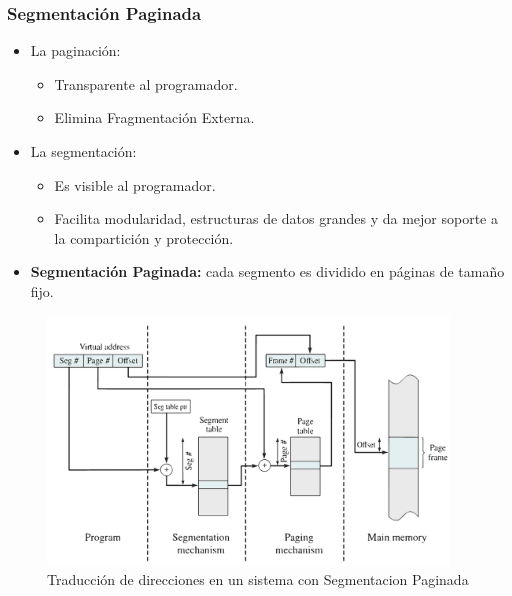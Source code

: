 \subsubsection{Segmentación Paginada}
\begin{itemize}
    \item La paginación:
    \begin{itemize}
        \item Transparente al programador.
        \item Elimina Fragmentación Externa.
    \end{itemize}
    \item La segmentación:
    \begin{itemize}
        \item Es visible al programador.
        \item Facilita modularidad, estructuras de datos grandes y da mejor soporte a la compartición y protección.
    \end{itemize}
    \item \textbf{Segmentación Paginada:} cada segmento es dividido en páginas de tamaño fijo.
\end{itemize}
\begin{figure}[h]
    \begin{center}
        \includegraphics[width=0.95\textwidth]{assets/SegmentacionPaginada.pdf}
    \end{center}
    \caption{Traducción de direcciones en un sistema con Segmentacion Paginada}\label{fig:}
\end{figure}
